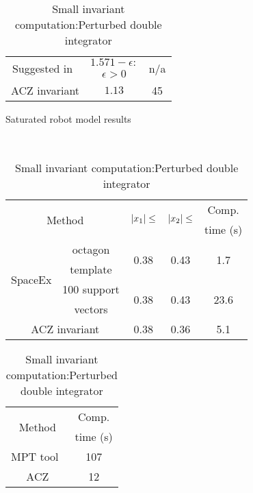 \begin{table}
\begin{minipage}{0.48\textwidth}
\begin{tabular}{|l|c|c|c|}
\hline
\multicolumn{2}{|c|}{\multirow{2}{*}{Suggested in~\cite{TODO}}} &
$1.571-\epsilon:$ & \multirow{2}{*}{n/a}\\
\multicolumn{2}{|c|}{} & $\epsilon>0$ &\\
\hline
\multicolumn{2}{|c|}{\multirow{2}{*}{ACZ invariant}} & \multirow{2}{*}{$1.13$} &
\multirow{2}{*}{45}\\
\multicolumn{2}{|c|}{} & &\\
\hline
\end{tabular}
\caption{Saturated robot model results}
~\label{tab:robot-saturated}
\end{minipage}
\begin{minipage}{0.45\textwidth}
\begin{tabular}{|l|c|c|c|c|}
\hline
\multicolumn{2}{|c|}{\multirow{2}{*}{Method}} &
\multirow{2}{*}{$\left|x_1\right|\leq$} & \multirow{2}{*}{$\left|x_2\right|\leq$} & Comp.\\
\multicolumn{2}{|c|}{} & & & time (s) \\
\hline
\multirow{4}{*}{SpaceEx} & octagon & \multirow{2}{*}{0.38} &
\multirow{2}{*}{0.43} & \multirow{2}{*}{1.7}\\
& template & & &\\
\cline{2-5}
& 100 support & \multirow{2}{*}{0.38} & \multirow{2}{*}{0.43} & \multirow{2}{*}{23.6}\\
& vectors & & &\\
\hline
\multicolumn{2}{|c|}{\multirow{2}{*}{ACZ invariant}} &
\multirow{2}{*}{0.38} & \multirow{2}{*}{0.36} & 
\multirow{2}{*}{5.1}\\
\multicolumn{2}{|c|}{} & & &\\
\hline
\end{tabular}
\caption{Small invariant computation:\newline Perturbed double integrator}
\vspace{1em}
\end{minipage}
\hspace{6em}
\begin{minipage}{0.35\textwidth}
\begin{tabular}{|c|c|}
\hline
\multirow{2}{*}{Method} & Comp.\\
& time (s)\\
\hline
\multirow{2}{*}{MPT tool~\cite{TODO}} & \multirow{2}{*}{107}\\
& \\
\hline
\multirow{2}{*}{ACZ} & \multirow{2}{*}{12}\\
& \\
\hline

\end{tabular}
\end{minipage}
\end{table}
